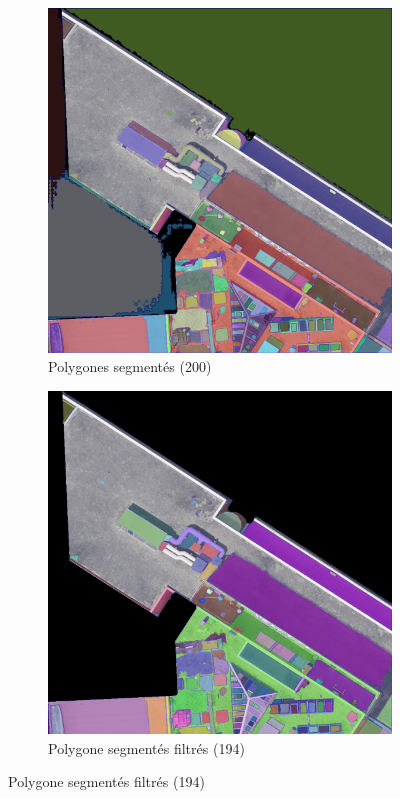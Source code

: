 \begin{figure}[H]
    \vspace{0.35cm} %
    
    \begin{subfigure}[b]{0.48\textwidth}
        \centering
        \includegraphics[width=\textwidth]{02-main/figures/ch3/ch3_essai_sam_03_200_masks.png}
        \caption{Polygones segmentés (200)}
        \label{fig:ch3_essai_sam_03_200_masks}
    \end{subfigure}
    \hfill
    \begin{subfigure}[b]{0.48\textwidth}
        \centering
        \includegraphics[width=\textwidth]{02-main/figures/ch3/ch3_essai_sam_04_194_filtered_masks.png}
        \caption{Polygone segmentés filtrés (194)}
        \label{fig:ch3_essai_sam_04_194_filtered_masks}
    \end{subfigure}


\end{figure}
